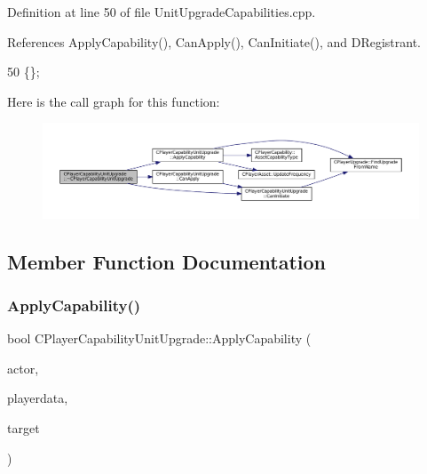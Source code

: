 Definition at line 50 of file Unit\+Upgrade\+Capabilities.\+cpp.



References Apply\+Capability(), Can\+Apply(), Can\+Initiate(), and D\+Registrant.


\begin{DoxyCode}
50 \{\};
\end{DoxyCode}
Here is the call graph for this function\+:\nopagebreak
\begin{figure}[H]
\begin{center}
\leavevmode
\includegraphics[width=350pt]{classCPlayerCapabilityUnitUpgrade_a7784e1fb92a26acb700c06ab38d2733b_cgraph}
\end{center}
\end{figure}


\subsection{Member Function Documentation}
\hypertarget{classCPlayerCapabilityUnitUpgrade_a8cc6fee17dd178fd798e36c3d5301e9d}{}\label{classCPlayerCapabilityUnitUpgrade_a8cc6fee17dd178fd798e36c3d5301e9d} 
\subsubsection{\texorpdfstring{Apply\+Capability()}{ApplyCapability()}}
{\footnotesize\ttfamily bool C\+Player\+Capability\+Unit\+Upgrade\+::\+Apply\+Capability (\begin{DoxyParamCaption}\item[{std\+::shared\+\_\+ptr$<$ \hyperlink{classCPlayerAsset}{C\+Player\+Asset} $>$}]{actor,  }\item[{std\+::shared\+\_\+ptr$<$ \hyperlink{classCPlayerData}{C\+Player\+Data} $>$}]{playerdata,  }\item[{std\+::shared\+\_\+ptr$<$ \hyperlink{classCPlayerAsset}{C\+Player\+Asset} $>$}]{target }\end{DoxyParamCaption})\hspace{0.3cm}{\ttfamily [virtual]}}



